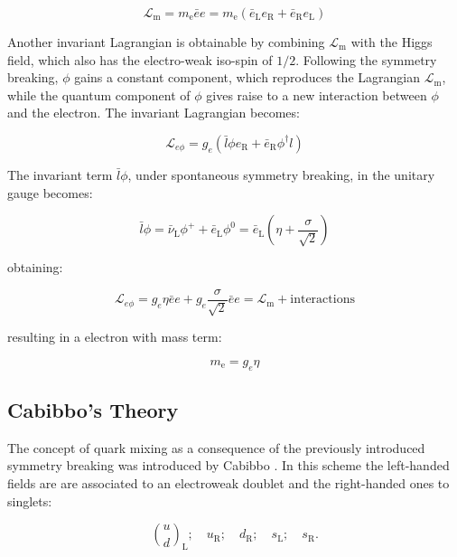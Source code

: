 \begin{equation}
\mathcal{L}_{\text{m}} = m_{\text{e}}\bar{e}e = m_{\text{e}}(\bar{e}_{\text{L}}e_{\text{R}} + \bar{e}_{\text{R}}e_{\text{L}})
\end{equation}

Another invariant Lagrangian is obtainable by combining $\mathcal{L}_{\text{m}}$ with the Higgs field, which also has the electro-weak iso-spin of $1/2$. Following the symmetry breaking, $\phi$ gains a constant component, which reproduces the Lagrangian  $\mathcal{L}_{\text{m}}$, while the quantum component of $\phi$ gives raise to a new interaction between $\phi$ and the electron. The invariant Lagrangian becomes:

\begin{equation}
\mathcal{L}_{e\phi} = g_{e} (\bar{l}\phi e_{\text{R}} + \bar{e}_{\text{R}}\phi^{\dagger}l)
\end{equation}

The invariant term $\bar{l}\phi$, under spontaneous symmetry breaking, in the unitary gauge becomes:

\begin{equation}
\bar{l}\phi = \bar{\nu}_{\text{L}}\phi^{+} + \bar{e}_{\text{L}}\phi^{0} = \bar{e}_{\text{L}}\left(\eta + \dfrac{\sigma}{\sqrt{2}}\right)
\end{equation}

obtaining:

\begin{equation}
\mathcal{L}_{e\phi} = g_{e}\eta\bar{e}e + g_{e} \dfrac{\sigma}{\sqrt{2}}\bar{e}e = \mathcal{L}_{\text{m}} + \text{interactions}
\end{equation}

resulting in a electron with mass term:

\begin{equation}
m_{\text{e}} = g_{e}\eta
\end{equation}

\subsection{Cabibbo's Theory}

The concept of quark mixing as a consequence of the previously introduced symmetry breaking was introduced by Cabibbo \cite{PhysRevLett.10.531}. In this scheme the left-handed fields are are associated to an electroweak doublet and the right-handed ones to singlets:

\begin{equation}
\binom{u}{d}_{\text{L}}; \quad u_{\text{R}}; \quad d_{\text{R}}; \quad s_{\text{L}}; \quad s_{\text{R}}.
\end{equation}

